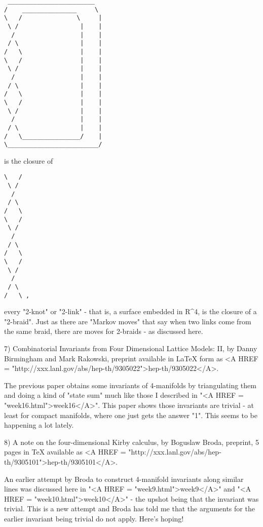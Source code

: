 \begin{verbatim}
 ________________________
/    _______________     \ 
\   /               \     |
 \ /                 |    |
  /                  |    |    
 / \                 |    |
/   \                |    |
\   /                |    |
 \ /                 |    |
  /                  |    |    
 / \                 |    |
/   \                |    |
\   /                |    |
 \ /                 |    |
  /                  |    |    
 / \                 |    |
/   \________________/    |
\_________________________/
\end{verbatim}
    

is the closure of

\begin{verbatim}
\   /       
 \ /        
  /         
 / \        
/   \       
\   /       
 \ /        
  /         
 / \        
/   \       
\   /       
 \ /        
  /         
 / \        
/   \ ,
\end{verbatim}
    

every "2-knot" or "2-link" - that is, a surface embedded in R^4, is the
closure of a "2-braid".  Just as there are "Markov moves" that say when
two links come from the same braid, there are moves for 2-braids - as
discussed here.

7) Combinatorial Invariants from Four Dimensional Lattice Models: II, by
Danny Birmingham and Mark Rakowski, preprint available in LaTeX form as
<A HREF = "http://xxx.lanl.gov/abs/hep-th/9305022">hep-th/9305022</A>.

The previous paper obtains some invariants of 4-manifolds by
triangulating them and doing a kind of "state sum" much like those I
described in "<A HREF = "week16.html">week16</A>".  This paper shows those invariants are trivial -
at least for compact manifolds, where one just gets the answer "1".
This seems to be happening a lot lately.

8)  A note on the four-dimensional Kirby calculus, by Boguslaw Broda,
preprint, 5 pages in TeX available as <A HREF = "http://xxx.lanl.gov/abs/hep-th/9305101">hep-th/9305101</A>.

An earlier attempt by Broda to construct 4-manifold invariants along
similar lines was discussed here in "<A HREF = "week9.html">week9</A>" and "<A HREF = "week10.html">week10</A>" - the upshot
being that the invariant was trivial.  This is a new attempt and Broda
has told me that the arguments for the earlier invariant being trivial
do not apply.  Here's hoping!

